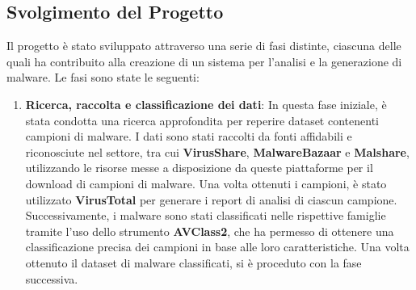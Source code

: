 \subsection{Svolgimento del Progetto}
Il progetto è stato sviluppato attraverso una serie di fasi distinte, ciascuna delle quali ha contribuito alla creazione di un sistema per l'analisi e la generazione di malware. Le fasi sono state le seguenti:
\begin{enumerate}
    \item \textbf{Ricerca, raccolta e classificazione dei dati}: In questa fase iniziale, è stata condotta una ricerca approfondita per reperire dataset contenenti campioni di malware. I dati sono stati raccolti da fonti affidabili e riconosciute nel settore, tra cui \textbf{VirusShare}, \textbf{MalwareBazaar} e \textbf{Malshare}, utilizzando le risorse messe a disposizione da queste piattaforme per il download di campioni di malware. Una volta ottenuti i campioni, è stato utilizzato \textbf{VirusTotal} per generare i report di analisi di ciascun campione. Successivamente, i malware sono stati classificati nelle rispettive famiglie tramite l'uso dello strumento \textbf{AVClass2}, che ha permesso di ottenere una classificazione precisa dei campioni in base alle loro caratteristiche. Una volta ottenuto il dataset di malware classificati, si è proceduto con la fase successiva.
    

\end{enumerate}
